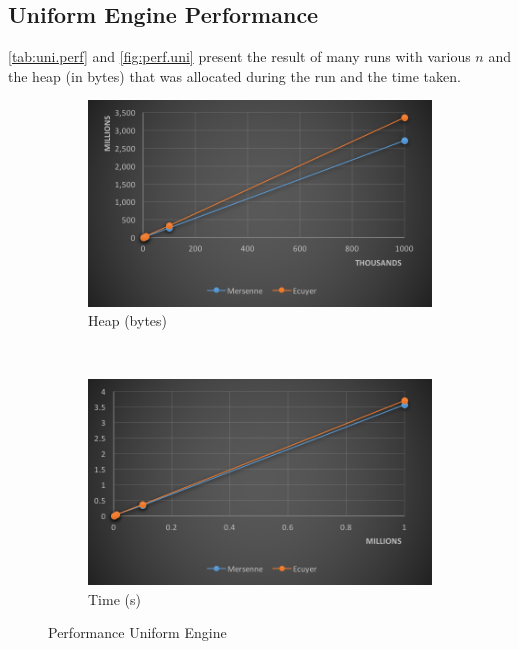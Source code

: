 \documentclass[12pt,a4paper,article]{memoir} %
\begin{document}
\subsection{Uniform Engine Performance}
\autoref{tab:uni.perf} and \autoref{fig:perf.uni} 
 present the result of many runs with various $n$ and
the heap (in bytes) that was allocated during the run and the time taken.
\begin{figure}[h!]
\centering
    \begin{subfigure}[b]{0.47\textwidth}
        \includegraphics[width=\textwidth]{img/perf-heap-uni.png}
        \caption{Heap (bytes)}
        \label{fig:perf.heap.uni}
    \end{subfigure}
    ~ 
    \begin{subfigure}[b]{0.47\textwidth}
        \includegraphics[width=\textwidth]{img/perf-time-uni.png}
        \caption{Time (s)}
        \label{fig:perf.time.uni}
    \end{subfigure}
\caption{Performance Uniform Engine}
\label{fig:perf.uni}
\end{figure}
\end{document}
